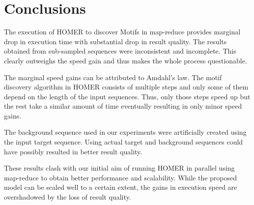 \documentclass{acm_proc_article-sp}
\begin{document}
\section{Conclusions}
The execution of HOMER to discover Motifs in map-reduce provides marginal drop in execution time with substantial drop in result quality. The results obtained from sub-sampled sequences were inconsistent and incomplete. This clearly outweighs the speed gain and thus makes the whole process questionable.

The marginal speed gains can be attributed to Amdahl's law. The motif discovery algorithm in HOMER consists of multiple steps and only some of them depend on the length of the input sequences. Thus, only those steps speed up but the rest take a similar amount of time eventually resulting in only minor speed gains.

The background sequence used in our experiments were artificially created using the input target sequence. Using actual target and background sequences could have possibly resulted in better result quality.

These results clash with our initial aim of running HOMER in parallel using map-reduce to obtain better performance and scalability. While the proposed model can be scaled well to a certain extent, the gains in execution speed are overshadowed by the loss of result quality.

  \appendix
\end{document}
